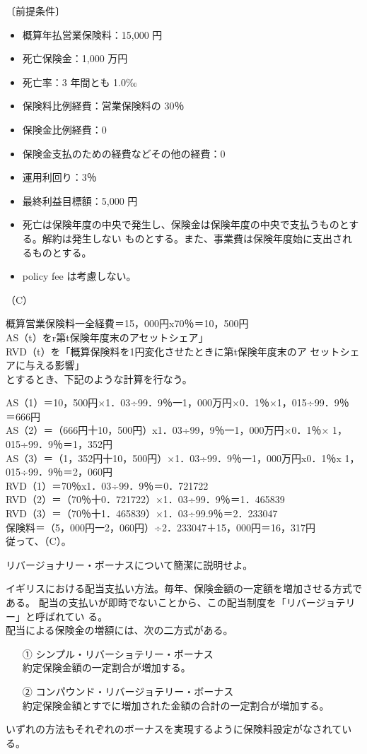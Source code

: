 \documentclass[report,gutter=10mm,fore-edge=10mm,uplatex,dvipdfmx]{jlreq}
\begin{document}
〔前提条件〕
\begin{itemize}
 \item  概算年払営業保険料：15,000 円
 \item 死亡保険金：1,000 万円
 \item  死亡率：3 年間とも 1.0‰
 \item  保険料比例経費：営業保険料の 30％
 \item  保険金比例経費：0
 \item  保険金支払のための経費などその他の経費：0
 \item  運用利回り：3％
 \item  最終利益目標額：5,000 円
 \item  死亡は保険年度の中央で発生し、保険金は保険年度の中央で支払うものとする。解約は発生しない
 ものとする。また、事業費は保険年度始に支出されるものとする。
 \item  policy fee は考慮しない。
\end{itemize}

（C）

概算営業保険料一全経費＝15，000円x70％＝10，500円\\
AS（t）をr第t保険年度末のアセットシェア」\\
RVD（t）を「概算保険料を1円変化させたときに第t保険年度末のア
セットシェアに与える影響」\\
とするとき、下記のような計算を行なう。

AS（1）＝10，500円×1．03÷99．9％一1，000万円×0．1％×1，015÷99．9％
＝666円\\
AS（2）＝（666円十10，500円）x1．03÷99，9％一1，000万円×0．1％×
1，015÷99．9％＝1，352円\\
AS（3）＝（1，352円十10，500円）×1．03÷99．9％一1，000万円x0．1％x
1，015÷99．9％＝2，060円\\
RVD（1）＝70％x1．03÷99．9％＝0．721722\\
RVD（2）＝（70％十0．721722）×1．03÷99．9％＝1．465839\\
RVD（3）＝（70％十1．465839）×1．03÷99.9％＝2．233047\\
保険料＝（5，000円一2，060円）÷2．233047＋15，000円＝16，317円\\
従って、（C）。

リバージョナリー・ボーナスについて簡潔に説明せよ。

イギリスにおける配当支払い方法。毎年、保険金額の一定額を増加させる方式である。
配当の支払いが即時でないことから、この配当制度を「リバージョテリー」と呼ばれてい
る。\\
配当による保険金の増額には、次の二方式がある。
\begin{itemize}
 \item [①]シンプル・リバーショテリー・ボーナス\\
約定保険金額の一定割合が増加する。
 \item [②]コンパウンド・リバージョテリー・ボーナス\\
約定保険金額とすでに増加された金額の合計の一定割合が増加する。
\end{itemize}
いずれの方法もそれぞれのボーナスを実現するように保険料設定がなされている。
\end{document}
